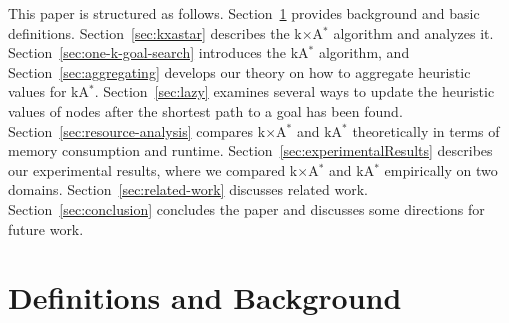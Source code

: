 \documentclass[smallextended]{svjour3}       %
\newcommand{\kastar}{kA$^*$\xspace}
\newcommand{\kxastar}{k$\times$A$^*$\xspace}
\begin{document}
This paper is structured as follows. Section~\ref{sec:defAndBackground} provides background and basic definitions. 
Section~\ref{sec:kxastar} describes the \kxastar algorithm and analyzes it. 
Section~\ref{sec:one-k-goal-search} introduces the \kastar algorithm, 
and Section~\ref{sec:aggregating} develops our theory on how to aggregate heuristic values for \kastar. Section~\ref{sec:lazy} examines several ways to update the heuristic values of nodes after the shortest path to a goal has been found. Section~\ref{sec:resource-analysis} compares \kxastar and \kastar theoretically in terms of memory consumption and runtime. 
Section~\ref{sec:experimentalResults} describes our experimental results, where we compared \kxastar and \kastar empirically on two domains. 
Section~\ref{sec:related-work} discusses related work. 
Section~\ref{sec:conclusion} concludes the paper and discusses some directions for future work. 


\section{Definitions and Background}
\label{sec:defAndBackground}
\end{document}
